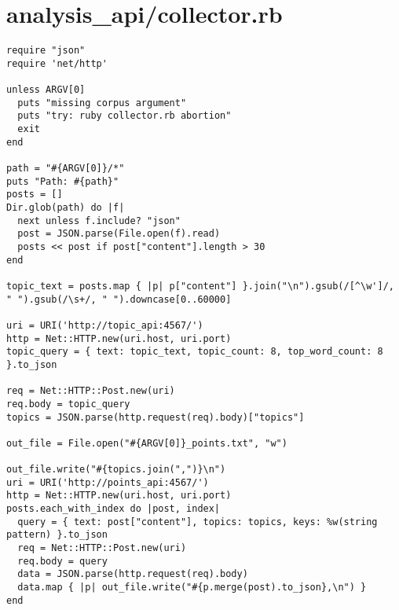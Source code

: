 \documentclass{article}
\begin{document}
\section*{analysis\_api/collector.rb}
\begin{verbatim}
require "json"
require 'net/http'

unless ARGV[0]
  puts "missing corpus argument"
  puts "try: ruby collector.rb abortion"
  exit
end

path = "#{ARGV[0]}/*"
puts "Path: #{path}"
posts = []
Dir.glob(path) do |f|
  next unless f.include? "json"
  post = JSON.parse(File.open(f).read)
  posts << post if post["content"].length > 30
end

topic_text = posts.map { |p| p["content"] }.join("\n").gsub(/[^\w']/, " ").gsub(/\s+/, " ").downcase[0..60000]

uri = URI('http://topic_api:4567/')
http = Net::HTTP.new(uri.host, uri.port)
topic_query = { text: topic_text, topic_count: 8, top_word_count: 8 }.to_json

req = Net::HTTP::Post.new(uri)
req.body = topic_query
topics = JSON.parse(http.request(req).body)["topics"]

out_file = File.open("#{ARGV[0]}_points.txt", "w")

out_file.write("#{topics.join(",")}\n")
uri = URI('http://points_api:4567/')
http = Net::HTTP.new(uri.host, uri.port)
posts.each_with_index do |post, index|
  query = { text: post["content"], topics: topics, keys: %w(string pattern) }.to_json
  req = Net::HTTP::Post.new(uri)
  req.body = query
  data = JSON.parse(http.request(req).body)
  data.map { |p| out_file.write("#{p.merge(post).to_json},\n") }
end


\end{verbatim}
\pagebreak
\end{document}
